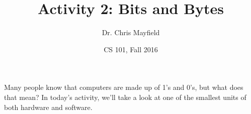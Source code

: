 \documentclass[12pt]{article}
\title{Activity 2: Bits and Bytes}
\author{Dr. Chris Mayfield}
\date{CS 101, Fall 2016}
\begin{document}
\maketitle

Many people know that computers are made up of 1's and 0's, but what does that mean? In today's activity, we'll take a look at one of the smallest units of both hardware and software.

%


\end{document}

